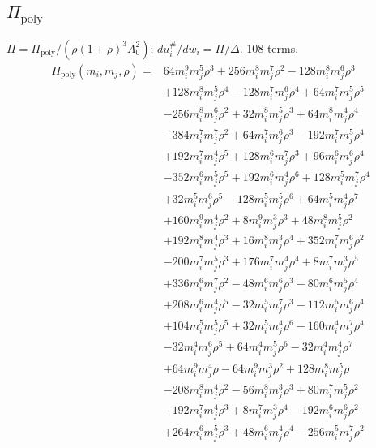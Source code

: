 \subsection*{$\Pi_{\mathrm{poly}}$}
$\Pi=\Pi_{\mathrm{poly}}/(\rho(1+\rho)^3A_0^2)$; $du_i^\#/dw_i=\Pi/\Delta$. 108 terms.
{\small
\begin{align*}
\Pi_{\mathrm{poly}}(m_i,m_j,\rho)={}&64m_i^{9} m_j^{5} \rho^{3}+256m_i^{8} m_j^{7} \rho^{2}-128m_i^{8} m_j^{6} \rho^{3}\\
&+128m_i^{8} m_j^{5} \rho^{4}-128m_i^{7} m_j^{6} \rho^{4}+64m_i^{7} m_j^{5} \rho^{5}\\
&-256m_i^{8} m_j^{6} \rho^{2}+32m_i^{8} m_j^{5} \rho^{3}+64m_i^{8} m_j^{4} \rho^{4}\\
&-384m_i^{7} m_j^{7} \rho^{2}+64m_i^{7} m_j^{6} \rho^{3}-192m_i^{7} m_j^{5} \rho^{4}\\
&+192m_i^{7} m_j^{4} \rho^{5}+128m_i^{6} m_j^{7} \rho^{3}+96m_i^{6} m_j^{6} \rho^{4}\\
&-352m_i^{6} m_j^{5} \rho^{5}+192m_i^{6} m_j^{4} \rho^{6}+128m_i^{5} m_j^{7} \rho^{4}\\
&+32m_i^{5} m_j^{6} \rho^{5}-128m_i^{5} m_j^{5} \rho^{6}+64m_i^{5} m_j^{4} \rho^{7}\\
&+160m_i^{9} m_j^{4} \rho^{2}+8m_i^{9} m_j^{3} \rho^{3}+48m_i^{8} m_j^{5} \rho^{2}\\
&+192m_i^{8} m_j^{4} \rho^{3}+16m_i^{8} m_j^{3} \rho^{4}+352m_i^{7} m_j^{6} \rho^{2}\\
&-200m_i^{7} m_j^{5} \rho^{3}+176m_i^{7} m_j^{4} \rho^{4}+8m_i^{7} m_j^{3} \rho^{5}\\
&+336m_i^{6} m_j^{7} \rho^{2}-48m_i^{6} m_j^{6} \rho^{3}-80m_i^{6} m_j^{5} \rho^{4}\\
&+208m_i^{6} m_j^{4} \rho^{5}-32m_i^{5} m_j^{7} \rho^{3}-112m_i^{5} m_j^{6} \rho^{4}\\
&+104m_i^{5} m_j^{5} \rho^{5}+32m_i^{5} m_j^{4} \rho^{6}-160m_i^{4} m_j^{7} \rho^{4}\\
&-32m_i^{4} m_j^{6} \rho^{5}+64m_i^{4} m_j^{5} \rho^{6}-32m_i^{4} m_j^{4} \rho^{7}\\
&+64m_i^{9} m_j^{4} \rho-64m_i^{9} m_j^{3} \rho^{2}+128m_i^{8} m_j^{5} \rho\\
&-208m_i^{8} m_j^{4} \rho^{2}-56m_i^{8} m_j^{3} \rho^{3}+80m_i^{7} m_j^{5} \rho^{2}\\
&-192m_i^{7} m_j^{4} \rho^{3}+8m_i^{7} m_j^{3} \rho^{4}-192m_i^{6} m_j^{6} \rho^{2}\\
&+264m_i^{6} m_j^{5} \rho^{3}+48m_i^{6} m_j^{4} \rho^{4}-256m_i^{5} m_j^{7} \rho^{2}\\

\end{align*}}
